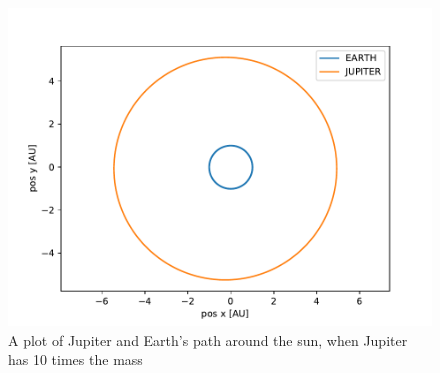 \documentclass[a4paper]{article}
\begin{document}
	\begin{figure}[h!]
		\centering 
		\includegraphics[scale=0.7]{../opp_e10.pdf}
		\caption{A plot of Jupiter and Earth's path around the sun, when Jupiter has 10 times the mass}
		\label{e_10}
	\end{figure}
	
\end{document}
